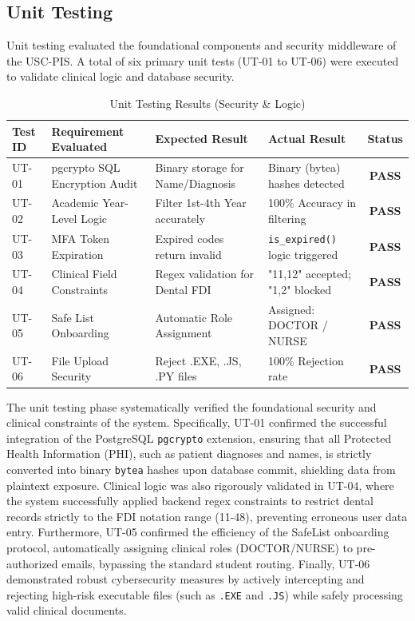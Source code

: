 \subsection{Unit Testing}

Unit testing evaluated the foundational components and security middleware of the USC-PIS. A total of six primary unit tests (UT-01 to UT-06) were executed to validate clinical logic and database security.

\begin{table}[htbp]
    \centering
    \caption{Unit Testing Results (Security \& Logic)}
    \label{tab:unit_testing}
    \begin{tabularx}{\textwidth}{|l|Y|Y|Y|c|}
        \hline
        \textbf{Test ID} & \textbf{Requirement Evaluated} & \textbf{Expected Result} & \textbf{Actual Result} & \textbf{Status} \\ \hline
        UT-01 & pgcrypto SQL Encryption Audit & Binary storage for Name/Diagnosis & Binary (bytea) hashes detected & \textbf{PASS} \\ \hline
        UT-02 & Academic Year-Level Logic & Filter 1st-4th Year accurately & 100\% Accuracy in filtering & \textbf{PASS} \\ \hline
        UT-03 & MFA Token Expiration & Expired codes return invalid & \texttt{is\_expired()} logic triggered & \textbf{PASS} \\ \hline
        UT-04 & Clinical Field Constraints & Regex validation for Dental FDI & "11,12" accepted; "1,2" blocked & \textbf{PASS} \\ \hline
        UT-05 & Safe List Onboarding & Automatic Role Assignment & Assigned: DOCTOR / NURSE & \textbf{PASS} \\ \hline
        UT-06 & File Upload Security & Reject .EXE, .JS, .PY files & 100\% Rejection rate & \textbf{PASS} \\ \hline
    \end{tabularx}
\end{table}

The unit testing phase systematically verified the foundational security and clinical constraints of the system. Specifically, UT-01 confirmed the successful integration of the PostgreSQL \texttt{pgcrypto} extension, ensuring that all Protected Health Information (PHI), such as patient diagnoses and names, is strictly converted into binary \texttt{bytea} hashes upon database commit, shielding data from plaintext exposure. Clinical logic was also rigorously validated in UT-04, where the system successfully applied backend regex constraints to restrict dental records strictly to the FDI notation range (11-48), preventing erroneous user data entry. Furthermore, UT-05 confirmed the efficiency of the SafeList onboarding protocol, automatically assigning clinical roles (DOCTOR/NURSE) to pre-authorized emails, bypassing the standard student routing. Finally, UT-06 demonstrated robust cybersecurity measures by actively intercepting and rejecting high-risk executable files (such as \texttt{.EXE} and \texttt{.JS}) while safely processing valid clinical documents.

